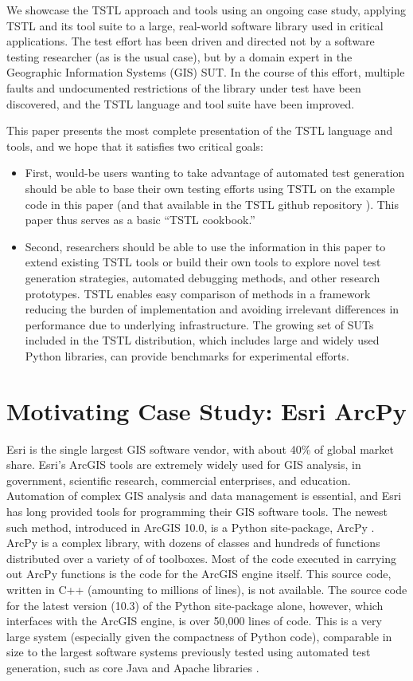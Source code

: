 We showcase the TSTL approach and tools using an ongoing case study,
applying TSTL and its tool suite to a large, real-world software
library used in critical applications.  The test effort has been driven and directed not by a
software testing researcher (as is the usual case), but by a domain
expert in the Geographic Information Systems (GIS) SUT.  In the
course of this effort, multiple faults and undocumented restrictions of the library
under test have been discovered, and the TSTL language and tool suite have
been improved.

This paper presents the most complete presentation of the TSTL
language and tools, and we hope that it satisfies two critical goals:

\begin{itemize}
\item First, would-be users wanting to take advantage of automated
  test generation should be able to base their own testing
  efforts using TSTL on the example code in this paper (and that available
  in the TSTL github repository \cite{tstl}).
  This paper thus serves as a basic ``TSTL cookbook.''

\item Second, researchers should be able to use the information in this paper to
  extend existing TSTL tools or build their own tools to explore novel
  test generation strategies, automated debugging methods, and other
  research prototypes.  TSTL enables easy comparison of
  methods in a framework reducing the burden of implementation
  and avoiding irrelevant differences in performance due to underlying
  infrastructure.  The growing set of SUTs
  included in the TSTL distribution, which includes large and widely
  used Python libraries, can provide benchmarks for
  experimental efforts.  
\end{itemize}


\section{Motivating Case Study: Esri ArcPy}


Esri is the single largest GIS software vendor, with about 40\% of
global market share.  Esri's ArcGIS tools are extremely widely used
for GIS analysis, in government, scientific research, commercial
enterprises, and education.  Automation of complex GIS analysis and
data management is essential, and Esri has long provided tools for
programming their GIS software tools.  The newest such method,
introduced in ArcGIS 10.0, is a Python site-package, ArcPy
\cite{ArcPy}.  ArcPy is a complex library, with dozens of classes and
hundreds of functions distributed over a variety of of toolboxes.
Most of the code executed in carrying out ArcPy functions is the code
for the ArcGIS engine itself.  This source code, written in C++
(amounting to millions of lines), is
not available.  The source code for the latest version (10.3) of the
Python site-package alone, however, which interfaces with the ArcGIS
engine, is over 50,000 lines of code.  This is a very large system
(especially given the compactness of Python code), comparable in size
to the largest software systems previously tested using automated test
generation, such as core Java and Apache libraries
\cite{FA11,Pacheco}.

